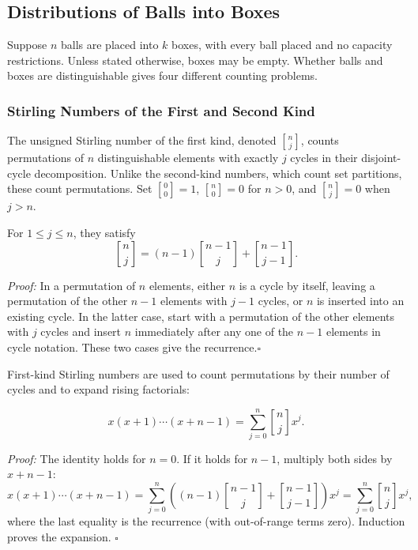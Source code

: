 \documentclass[a4paper,11pt,abstracton]{scrartcl}
\newcommand{\genstirlingI}[3]{%
  \genfrac{[}{]}{0pt}{#1}{#2}{#3}%
}
\newcommand{\stirlingI}[2]{\genstirlingI{}{#1}{#2}}
\theoremstyle{dotlessP}
\theoremstyle{dotlessS}
\theoremstyle{remark}
\theoremstyle{definition}
\begin{document}
\subsection{Distributions of Balls into Boxes}

Suppose $n$ balls are placed into $k$ boxes, with every ball placed and no capacity restrictions. Unless stated otherwise, boxes may be empty. Whether balls and boxes are distinguishable gives four different counting problems.

\subsubsection{Stirling Numbers of the First and Second Kind}

The unsigned Stirling number of the first kind, denoted $\stirlingI{n}{j}$, counts permutations of $n$ distinguishable elements with exactly $j$ cycles in their disjoint-cycle decomposition. Unlike the second-kind numbers, which count set partitions, these count permutations. Set $\stirlingI{0}{0}=1$, $\stirlingI{n}{0}=0$ for $n>0$, and $\stirlingI{n}{j}=0$ when $j>n$.

For $1\leq j\leq n$, they satisfy
\[
  \stirlingI{n}{j}=(n-1)\stirlingI{n-1}{j}+\stirlingI{n-1}{j-1}.
\]
\begin{claim_box}
\textit{Proof:} In a permutation of $n$ elements, either $n$ is a cycle by itself, leaving a permutation of the other $n-1$ elements with $j-1$ cycles, or $n$ is inserted into an existing cycle. In the latter case, start with a permutation of the other elements with $j$ cycles and insert $n$ immediately after any one of the $n-1$ elements in cycle notation. These two cases give the recurrence.\hfill$\square$
\end{claim_box}

First-kind Stirling numbers are used to count permutations by their number of cycles and to expand rising factorials:

\[
  x(x+1)\cdots(x+n-1)=\sum_{j=0}^{n}\stirlingI{n}{j}x^j.
\]
\begin{claim_box}
\textit{Proof:} The identity holds for $n=0$. If it holds for $n-1$, multiply both sides by $x+n-1$:
\[
  x(x+1)\cdots(x+n-1)
  =\sum_{j=0}^{n}\left((n-1)\stirlingI{n-1}{j}+\stirlingI{n-1}{j-1}\right)x^j
  =\sum_{j=0}^{n}\stirlingI{n}{j}x^j,
\]
where the last equality is the recurrence (with out-of-range terms zero). Induction proves the expansion.
\hfill$\square$
\end{claim_box}
\end{document}
